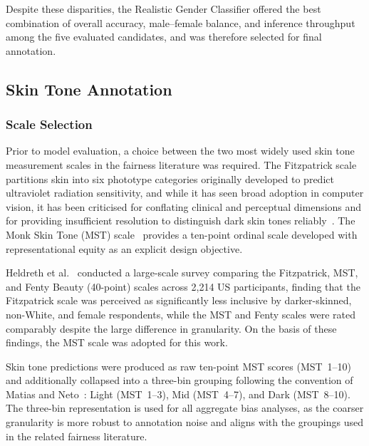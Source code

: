 Despite these disparities, the Realistic Gender Classifier offered the best combination of overall accuracy, male--female balance, and inference throughput among the five evaluated candidates, and was therefore selected for final annotation.

\subsection{Skin Tone Annotation}
\label{sec:skintone_annotation}

\subsubsection{Scale Selection}

Prior to model evaluation, a choice between the two most widely used skin tone measurement scales in the fairness literature was required. The Fitzpatrick scale~\cite{Fitzpatrick_1988_SkinTypes} partitions skin into six phototype categories originally developed to predict ultraviolet radiation sensitivity, and while it has seen broad adoption in computer vision, it has been criticised for conflating clinical and perceptual dimensions and for providing insufficient resolution to distinguish dark skin tones reliably~\cite{Schumann_2024_MonkSkinTone}. The Monk Skin Tone (MST) scale~\cite{Schumann_2024_MonkSkinTone} provides a ten-point ordinal scale developed with representational equity as an explicit design objective.

Heldreth et al.~\cite{Heldreth_2024_WhichSkinToneMeasures} conducted a large-scale survey comparing the Fitzpatrick, MST, and Fenty Beauty (40-point) scales across 2{,}214 US participants, finding that the Fitzpatrick scale was perceived as significantly less inclusive by darker-skinned, non-White, and female respondents, while the MST and Fenty scales were rated comparably despite the large difference in granularity. On the basis of these findings, the MST scale was adopted for this work.

Skin tone predictions were produced as raw ten-point MST scores (MST~1--10) and additionally collapsed into a three-bin grouping following the convention of Matias and Neto~\cite{Matias_2024_EnhancingFairnessMST}: Light (MST~1--3), Mid (MST~4--7), and Dark (MST~8--10). The three-bin representation is used for all aggregate bias analyses, as the coarser granularity is more robust to annotation noise and aligns with the groupings used in the related fairness literature.

